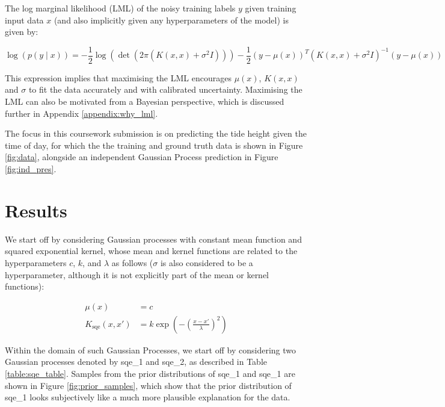 \documentclass{article}
\begin{document}
The log marginal likelihood (LML) of the noisy training labels $y$ given training input data $x$ (and also implicitly given any hyperparameters of the model) is given by:


\begin{equation}
    \log \left( p(y \mid x) \right) = -\frac{1}{2}\log\left(\det \left(2\pi\left( K(x, x) + \sigma^2 I \right)\right)\right) -\frac{1}{2}(y - \mu(x))^T \left( K(x, x) + \sigma^2 I \right)^{-1} (y - \mu(x))
\end{equation}

This expression implies that maximising the LML encourages $\mu(x)$, $K(x,x)$ and $\sigma$ to fit the data accurately and with calibrated uncertainty. Maximising the LML can also be motivated from a Bayesian perspective, which is discussed further in Appendix \ref{appendix:why_lml}.

The focus in this coursework submission is on predicting the tide height given the time of day, for which the the training and ground truth data is shown in Figure \ref{fig:data}, alongside an independent Gaussian Process prediction in Figure \ref{fig:ind_pres}.


\section{Results}

We start off by considering Gaussian processes with constant mean function and squared exponential kernel, whose mean and kernel functions are related to the hyperparameters $c$, $k$, and $\lambda$ as follows ($\sigma$ is also considered to be a hyperparameter, although it is not explicitly part of the mean or kernel functions):


\begin{align}
\mu(x) &= c \\
K_{\mathrm{sqe}}(x, x') &= k \exp\left( -\left( \frac{x - x'}{\lambda} \right)^2 \right)
\end{align}

Within the domain of such Gaussian Processes, we start off by considering two Gaussian processes denoted by sqe\_1 and sqe\_2, as described in Table \ref{table:sqe_table}. Samples from the prior distributions of sqe\_1 and sqe\_1 are shown in Figure \ref{fig:prior_samples}, which show that the prior distribution of sqe\_1 looks subjectively like a much more plausible explanation for the data.
\end{document}
